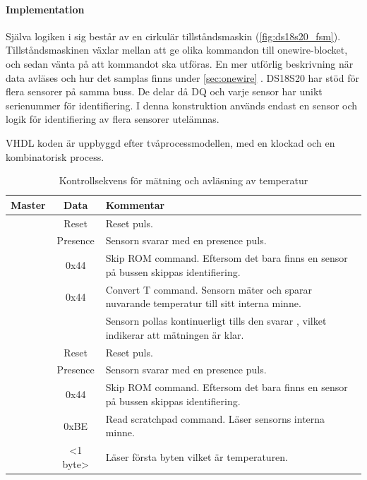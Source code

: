 \paragraph{Implementation}
Själva logiken i sig består av en cirkulär tillståndsmaskin (\autoref{fig:ds18s20_fsm}).
Tillståndsmaskinen växlar mellan att ge olika kommandon till onewire-blocket, och sedan vänta på att kommandot ska utföras. En mer utförlig beskrivning när data avläses och hur det samplas finns under \ref{sec:onewire} .
DS18S20 har stöd för flera sensorer på samma buss. De delar då DQ och varje sensor har unikt serienummer för identifiering. I denna konstruktion används endast en sensor och logik för identifiering av flera sensorer utelämnas.

VHDL koden är uppbyggd efter tvåprocessmodellen, med en klockad och en kombinatorisk process.


\begin{table}[H]

\begin{tabularx}{\textwidth}[h]{c c X}
	\hline
	\textbf{Master} & \textbf{Data} & \textbf{Kommentar} \\
	\hline
	
	\Tx & Reset & Reset puls.\\
	\Rx & Presence & Sensorn svarar med en presence puls.\\
	\Tx & 0x44 & Skip ROM command. Eftersom det bara finns en sensor på bussen skippas identifiering.\\
	\Tx & 0x44 & Convert T command. Sensorn mäter och sparar nuvarande temperatur till sitt interna minne.\\
	\Rx & & Sensorn pollas kontinuerligt tills den svarar \high{}, vilket indikerar att mätningen är klar.\\
	\Tx & Reset & Reset puls.\\
	\Rx & Presence & Sensorn svarar med en presence puls.\\
	\Tx & 0x44 & Skip ROM command. Eftersom det bara finns en sensor på bussen skippas identifiering.\\
	\Tx & 0xBE & Read scratchpad command. Läser sensorns interna minne.  \\
	\Rx & <1 byte> & Läser första byten vilket är temperaturen.\\
	
	\hline
\end{tabularx}
\caption{Kontrollsekvens för mätning och avläsning av temperatur}
\end{table}


